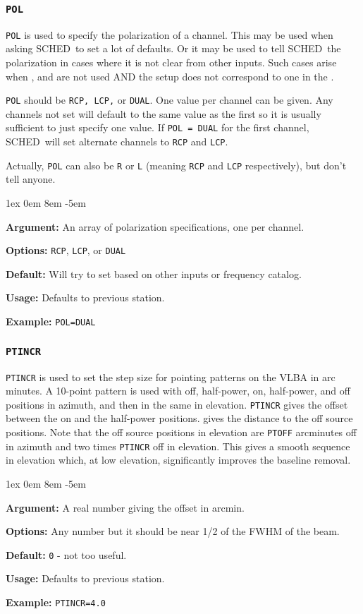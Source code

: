 \documentclass{report}
\newcommand{\schedb}{{\sc SCHED~}}
\newcommand{\rcwbox}[5]{
  \begin{list}{}{\parsep 1ex  \itemsep 0em
                 \leftmargin 8em  \itemindent -5em }
    \item {\bf Argument:} #1
    \item {\bf Options:}  #2
    \item {\bf Default:}  #3
    \item {\bf Usage:}    #4
    \item {\bf Example:}  #5
  \end{list}
}
\begin{document}
\subsubsection{\label{SP:POL}{\tt POL}}

{\tt POL} is used to specify the polarization of a channel.  This
may be used when asking \schedb to set a lot of defaults.  Or it
may be used to tell \schedb the polarization in cases where it
is not clear from other inputs.  Such cases arise when
, and 
are not used AND the setup does not correspond to one in the
.

{\tt POL} should be {\tt RCP, LCP,} or {\tt DUAL}.  One value per
channel can be given.  Any channels not set will default to the
same value as the first so it is usually sufficient to just specify
one value.  If {\tt POL = DUAL} for the first channel,
\schedb will set alternate channels to {\tt RCP} and {\tt LCP}.

Actually, {\tt POL} can also be {\tt R} or {\tt L} (meaning {\tt RCP}
and {\tt LCP} respectively), but don't tell anyone.

\rcwbox
{An array of polarization specifications, one per channel.}
{{\tt RCP}, {\tt LCP}, or {\tt DUAL}}
{Will try to set based on other inputs or frequency catalog.}
{Defaults to previous station.}
{{\tt POL=DUAL}}


\subsubsection{\label{SP:PTINCR}{\tt PTINCR}}

{\tt PTINCR} is used to set the step size for pointing patterns on the
VLBA in arc minutes. A 10-point pattern is used with off, half-power,
on, half-power, and off positions in azimuth, and then in the same in
elevation.  {\tt PTINCR} gives the offset between the on and the
half-power positions.  gives the
distance to the off source positions.  Note that the off source
positions in elevation are {\tt PTOFF} arcminutes off in azimuth
and two times {\tt PTINCR} off in elevation.  This gives a smooth
sequence in elevation which, at low elevation, significantly
improves the baseline removal.

\rcwbox
{A real number giving the offset in arcmin.}
{Any number but it should be near 1/2 of the FWHM of the beam.}
{{\tt 0} - not too useful.}
{Defaults to previous station.}
{{\tt PTINCR=4.0}}
\end{document}
